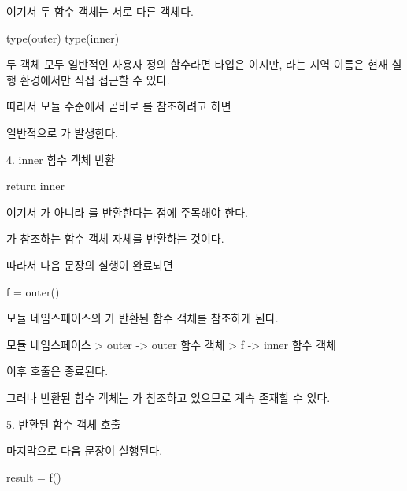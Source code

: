 여기서 두 함수 객체는 서로 다른 객체다.

\begin{dhkcode}
type(outer)
type(inner)
\end{dhkcode}

두 객체 모두 일반적인 사용자 정의 함수라면 타입은 이지만, 라는 지역 이름은 현재  실행 환경에서만 직접 접근할 수 있다.

따라서 모듈 수준에서 곧바로 를 참조하려고 하면 

일반적으로 가 발생한다.

\begin{dhknote}
\begin{dhksmry}[centered]
4. inner 함수 객체 반환
\end{dhksmry}
\end{dhknote}

\begin{dhkcode}
return inner
\end{dhkcode}

여기서 가 아니라 를 반환한다는 점에 주목해야 한다.

가 참조하는 함수 객체 자체를 반환하는 것이다.

따라서 다음 문장의 실행이 완료되면

\begin{dhkcode}
f = outer()
\end{dhkcode}

모듈 네임스페이스의 가 반환된 함수 객체를 참조하게 된다.

\begin{dhkdir}[in=6]
모듈 네임스페이스
> outer -> outer 함수 객체
> f -> inner 함수 객체
\end{dhkdir}

이후  호출은 종료된다.

그러나 반환된  함수 객체는 가 참조하고 있으므로 계속 존재할 수 있다.

\begin{dhknote}
\begin{dhksmry}[centered]
5. 반환된 함수 객체 호출
\end{dhksmry}
\end{dhknote}

마지막으로 다음 문장이 실행된다.

\begin{dhkcode}
result = f()
\end{dhkcode}


